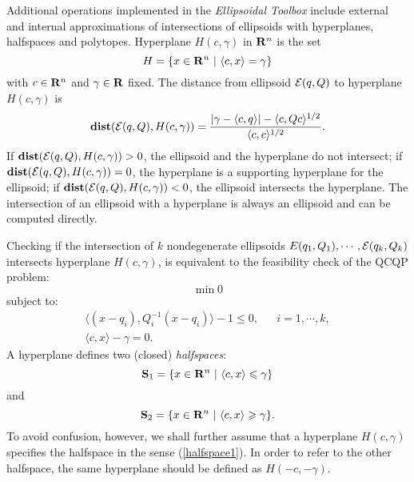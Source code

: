 Additional operations implemented in the {\it Ellipsoidal Toolbox} include
external and internal approximations of intersections of ellipsoids with
hyperplanes, halfspaces and polytopes.
\bd
Hyperplane $H(c,\gamma)$ in ${\bf R}^n$ is the set
\begin{equation}
H = \{x\in{\bf R}^n ~|~ \langle c, x\rangle = \gamma\}
\label{hyperplane}
\end{equation}
with $c\in{\bf R}^n$ and $\gamma\in{\bf R}$ fixed.
\label{hyperplanedef}
\ed
The distance from ellipsoid $\EE(q,Q)$ to hyperplane $H(c,\gamma)$ is
\begin{equation}
{\bf dist}(\EE(q,Q),H(c,\gamma)) =
\frac{\left|\gamma-\langle c,q\rangle\right| -
\langle c,Qc\rangle^{1/2}}{\langle c,c\rangle^{1/2}}. \label{dist_hp}
\end{equation}
If ${\bf dist}(\EE(q,Q),H(c,\gamma))>0$, the ellipsoid and the hyperplane
do not intersect;
if ${\bf dist}(\EE(q,Q),H(c,\gamma))=0$, the hyperplane is a supporting
hyperplane for the ellipsoid;
if ${\bf dist}(\EE(q,Q),H(c,\gamma))<0$, the ellipsoid intersects the
hyperplane.
The intersection of an ellipsoid with a hyperplane is always an ellipsoid
and can be computed directly.

Checking if the intersection of $k$ nondegenerate ellipsoids
$E(q_1,Q_1),\cdots,\EE(q_k,Q_k)$ intersects  hyperplane $H(c,\gamma)$,
is equivalent to the feasibility check of the QCQP problem:
\[ \min 0 \]
subject to:
\begin{eqnarray*}
\langle (x-q_i),Q_i^{-1}(x-q_i)\rangle - 1 \leq 0, & & i=1,\cdots,k,\\
\langle c, x\rangle - \gamma = 0. & &
\end{eqnarray*}
A hyperplane defines two (closed) {\it halfspaces}:
\begin{equation}
{\bf S}_1 = \{x\in{\bf R}^n ~|~ \langle c, x\rangle \leq \gamma\}
\label{halfspace1}
\end{equation}
and
\begin{equation}
{\bf S}_2 = \{x\in{\bf R}^n ~|~ \langle c, x\rangle \geq \gamma\}.
\label{halfspace2}
\end{equation}
To avoid confusion, however, we shall further assume that a
 hyperplane $H(c,\gamma)$ specifies the halfspace in the sense
(\ref{halfspace1}). In order to refer to the
other halfspace, the same hyperplane should be defined as $H(-c,-\gamma)$.

